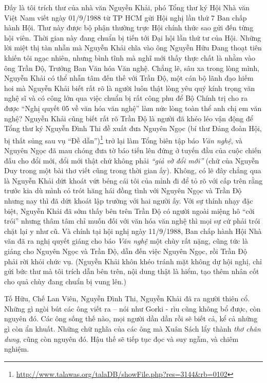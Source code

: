 \documentclass[../main.tex]{subfiles}
\begin{document}
\begin{multicols}{2}
Đấy là tôi trích thư của nhà văn Nguyễn Khải, phó Tổng thư ký Hội Nhà văn Việt Nam viết ngày 01/9/1988 từ TP HCM gửi Hội nghị lần thứ 7 Ban chấp hành Hội. Thư này được bộ phận thường trực Hội chính thức sao gửi đến từng hội viên. Thời gian này đang chuẩn bị tiến tới Đại hội lần thứ tư của Hội. Những lời miệt thị tàn nhẫn mà Nguyễn Khải chĩa vào ông Nguyễn Hữu Đang thoạt tiên khiến tôi ngạc nhiên, nhưng bình tĩnh mà nghĩ mới thấy thực chất là nhằm vào ông Trần Độ, Trưởng Ban Văn hóa Văn nghệ. Chẳng lẽ, sâu xa trong lòng mình, Nguyễn Khải có thể nhẫn tâm đến thế với Trần Độ, một cán bộ lãnh đạo hiếm hoi mà Nguyễn Khải biết rất rõ là người luôn thật lòng yêu quý kính trọng văn nghệ sĩ và có công lớn qua việc chuẩn bị rất công phu để Bộ Chính trị cho ra được “Nghị quyết 05 về văn hóa văn nghệ” làm nức lòng toàn thể anh chị em văn nghệ? Nguyễn Khải cũng biết rất rõ Trần Độ là người đã khéo léo vận động để Tổng thư ký Nguyễn Đình Thi đề xuất đưa Nguyên Ngọc (bí thư Đảng đoàn Hội, bị thất sủng sau vụ “Đề dẫn”)\footnote{\url{http://www.talawas.org/talaDB/showFile.php?res=3144&rb=0102}} trở lại làm Tổng biên tập báo \textit{Văn nghệ}, và Nguyên Ngọc đã mau chóng đưa tờ báo tiến lên đứng ở tuyến đầu của cuộc chiến đấu cho đổi mới, đổi mới thật chứ không phải \textit{“giả vờ} \textit{đổi mới” }(chữ của Nguyễn Duy trong một bài thơ viết cũng trong thời gian ấy). Không, có lẽ đây chẳng qua là Nguyễn Khải dứt khoát vứt béng cái tôi của mình đi để tỏ rõ với cấp trên rằng trước kia dù mình có trót hăng hái đồng tình với Nguyên Ngọc và Trần Độ nhưng nay thì đã dứt khoát lập trường với hai người ấy. Với sự thính nhạy đặc biệt, Nguyễn Khải đã sớm thấy bên trên Trần Độ có người ngoài miệng hô “cởi trói” nhưng thâm tâm chỉ muốn đối với văn hóa văn nghệ thì mọi sự cứ phải trói chặt lại y như cũ. Và chính tại hội nghị ngày 11/9/1988, Ban chấp hành Hội Nhà văn đã ra nghị quyết giáng cho báo \textit{Văn nghệ} một chùy rất nặng, cũng tức là giáng cho Nguyên Ngọc và Trần Độ, dẫn đến việc Nguyên Ngọc, rồi Trần Độ phải rời khỏi chức vụ. (Nguyễn Khải khôn khéo tránh mặt không dự hội nghị, chỉ gửi bức thư mà tôi trích dẫn bên trên, nội dung thật là hiểm, tạo thêm nhân cốt cho quả chùy đang chuẩn bị vung lên.) 
 
Tố Hữu, Chế Lan Viên, Nguyễn Đình Thi, Nguyễn Khải đã ra người thiên cổ. Những gì ngòi bút các ông viết ra – nói như Gorki - rìu cũng không bổ được, còn nguyên đó. Các ông sống thế nào, mọi người dần dần rồi sẽ biết cả, kể cả những gì còn ẩn khuất. Những chữ nghĩa của các ông mà Xuân Sách lẩy thành \textit{thơ chân dung}, cũng còn nguyên đó. Hậu thế sẽ tiếp tục đọc và suy ngẫm, và chiêm nghiệm. 
 

\end{multicols}
\end{document}
